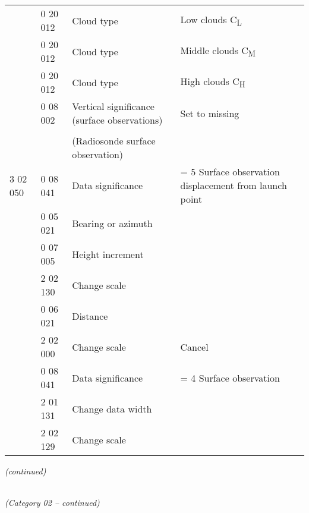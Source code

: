 \begin{longtable}[]{@{}llll@{}}
& 0 20 012 & Cloud type & Low clouds C\textsubscript{L}\tabularnewline
& 0 20 012 & Cloud type & Middle clouds C\textsubscript{M}\tabularnewline
& 0 20 012 & Cloud type & High clouds C\textsubscript{H}\tabularnewline
& 0 08 002 & Vertical significance (surface observations) & Set to missing\tabularnewline
& & &\tabularnewline
& & (Radiosonde surface observation) &\tabularnewline
3 02 050 & 0 08 041 & Data significance & = 5 Surface observation displacement from launch point\tabularnewline
& 0 05 021 & Bearing or azimuth &\tabularnewline
& 0 07 005 & Height increment &\tabularnewline
& 2 02 130 & Change scale &\tabularnewline
& 0 06 021 & Distance &\tabularnewline
& 2 02 000 & Change scale & Cancel\tabularnewline
& 0 08 041 & Data significance & = 4 Surface observation\tabularnewline
& 2 01 131 & Change data width &\tabularnewline
& 2 02 129 & Change scale &\tabularnewline
\bottomrule
\end{longtable}

\emph{(continued)}

\emph{\\
(Category 02 -- continued)}

